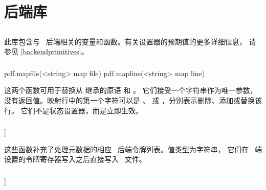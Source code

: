 \chapter{后端库}\label{backend}

\section{}

\topicindex{\PDF}

此库包含与 \PDF\ 后端相关的变量和函数。有关设置器的预期值的更多详细信息，
请参见 \ref{backendprimitives}。

\subsection{}


\begin{typing}
pdf.mapfile(<string> map file)
pdf.mapline(<string> map line)
\end{typing}

这两个函数可用于替换从 \PDFTEX 继承的原语  和 。
它们接受一个字符串作为唯一参数，没有返回值。映射行中的第一个字符可以是
\type {-}、\type {+} 或 \type {=}，分别表示删除、添加或替换该行。
它们不是状态设置器，而是立即生效。

\subsection{{\type {[set|get}}}]


 
    
   
 

这些函数补充了处理元数据的相应 \PDF\ 后端令牌列表。值类型为字符串，
它们在 \TEX\ 端设置的令牌寄存器写入之后直接写入 \PDF\ 文件。

\subsection{{\type {[set|get}}}]

  
   
 

